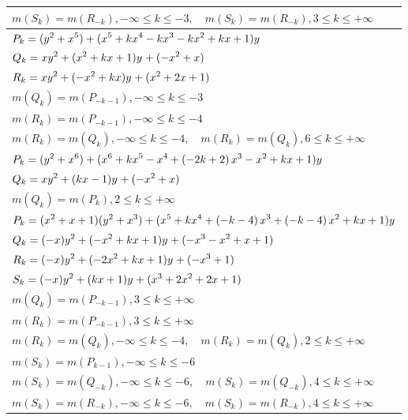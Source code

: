 \documentclass{amsart}
\begin{document}
\begin{longtable}{|l|}
\(\displaystyle m(S_k) = m(R_{-k}),-\infty \leqslant k \leqslant -3,\quad m(S_k) = m(R_{-k}),3 \leqslant k \leqslant +\infty\)\\
\hline
\(\displaystyle P_k=(y^2+x^5)+(x^5
 + k\*x^4
 - k\*x^3
 - k\*x^2
 + k\*x
 + 1)y\)\\
\(\displaystyle Q_k=xy^{2}+(x^2
 + k\*x
 + 1)y^{}+(-x^2
 + x)\)\\
\(\displaystyle R_k=xy^{2}+(-x^2
 + k\*x)y^{}+(x^2
 + 2\*x
 + 1)\)\\
\(\displaystyle m(Q_k) = m(P_{-k
 - 1}),-\infty \leqslant k \leqslant -3\)\\
\(\displaystyle m(R_k) = m(P_{-k
 - 1}),-\infty \leqslant k \leqslant -4\)\\
\(\displaystyle m(R_k) = m(Q_{k}),-\infty \leqslant k \leqslant -4,\quad m(R_k) = m(Q_{k}),6 \leqslant k \leqslant +\infty\)\\
\hline
\(\displaystyle P_k=(y^2+x^6)+(x^6
 + k\*x^5
 - x^4
 + \left(-2\*k
 + 2\right) \*x^3
 - x^2
 + k\*x
 + 1)y\)\\
\(\displaystyle Q_k=xy^{2}+(k\*x
 - 1)y^{}+(-x^2
 + x)\)\\
\(\displaystyle m(Q_k) = m(P_{k}),2 \leqslant k \leqslant +\infty\)\\
\hline
\(\displaystyle P_k=(x^2
 + x
 + 1)(y^2+x^3)+(x^5
 + k\*x^4
 + \left(-k
 - 4\right) \*x^3
 + \left(-k
 - 4\right) \*x^2
 + k\*x
 + 1)y\)\\
\(\displaystyle Q_k=(-x)y^{2}+(-x^2
 + k\*x
 + 1)y^{}+(-x^3
 - x^2
 + x
 + 1)\)\\
\(\displaystyle R_k=(-x)y^{2}+(-2\*x^2
 + k\*x
 + 1)y^{}+(-x^3
 + 1)\)\\
\(\displaystyle S_k=(-x)y^{2}+(k\*x
 + 1)y^{}+(x^3
 + 2\*x^2
 + 2\*x
 + 1)\)\\
\(\displaystyle m(Q_k) = m(P_{-k
 - 1}),3 \leqslant k \leqslant +\infty\)\\
\(\displaystyle m(R_k) = m(P_{-k
 - 1}),3 \leqslant k \leqslant +\infty\)\\
\(\displaystyle m(R_k) = m(Q_{k}),-\infty \leqslant k \leqslant -4,\quad m(R_k) = m(Q_{k}),2 \leqslant k \leqslant +\infty\)\\
\(\displaystyle m(S_k) = m(P_{k
 - 1}),-\infty \leqslant k \leqslant -6\)\\
\(\displaystyle m(S_k) = m(Q_{-k}),-\infty \leqslant k \leqslant -6,\quad m(S_k) = m(Q_{-k}),4 \leqslant k \leqslant +\infty\)\\
\(\displaystyle m(S_k) = m(R_{-k}),-\infty \leqslant k \leqslant -6,\quad m(S_k) = m(R_{-k}),4 \leqslant k \leqslant +\infty\)\\

\end{longtable}
\end{document}
